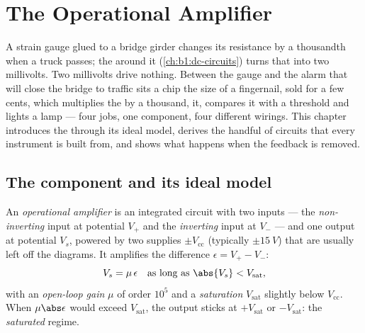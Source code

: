 \chapter{The Operational Amplifier}\label{ch:b1:operational-amplifier}

A strain gauge glued to a bridge girder changes its resistance by a
thousandth when a truck passes; the  around it
(\cref{ch:b1:dc-circuits}) turns that into two millivolts. Two
millivolts drive nothing. Between the gauge and the alarm that will
close the bridge to traffic sits a chip the size of a fingernail, sold
for a few cents, which multiplies the  by a thousand,  it,
compares it with a threshold and lights a lamp --- four jobs, one
component, four different wirings. This chapter introduces the
 through its ideal model, derives the handful of
circuits that every instrument is built from, and shows what happens
when the feedback is removed.

\section{The component and its ideal model}

\begin{definition}\label{def:b1:operational-amplifier:opamp}
An \emph{operational amplifier} is an integrated circuit with two
inputs --- the \emph{non-inverting} input at potential $V_+$ and the
\emph{inverting} input at $V_-$ --- and one output at potential $V_s$,
powered by two supplies $\pm V_{\mathrm{cc}}$ (typically
$\pm\qty{15}{V}$) that are usually left off the diagrams. It amplifies
the difference $\epsilon = V_+ - V_-$:
\[
V_s = \mu\,\epsilon \quad\text{as long as } \abs{V_s} < V_{\mathrm{sat}},
\]
with an \emph{open-loop gain} $\mu$ of order $10^5$ and a
\emph{saturation } $V_{\mathrm{sat}}$ slightly below
$V_{\mathrm{cc}}$. When $\mu\abs\epsilon$ would exceed $V_{\mathrm{sat}}$,
the output sticks at $+V_{\mathrm{sat}}$ or $-V_{\mathrm{sat}}$: the
\emph{saturated} regime.
\end{definition}

